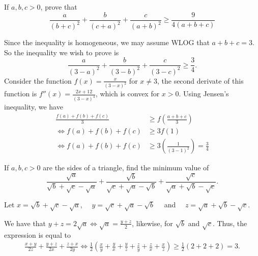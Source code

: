 \documentclass[12pt, paper=letter]{scrartcl}
\begin{document}
    \begin{problem*}
        If $a,b,c > 0$, prove that
        \[
            \frac{a}{(b + c)^2} + \frac{b}{(c + a)^2} + \frac{c}{(a + b)^2} \geq \frac{9}{4(a + b + c)}
        \]
    \end{problem*}
    \begin{solution*}
        Since the inequality is homogeneous, we may assume WLOG that $a + b + c = 3$.
        So the inequality we wish to prove is
        \[
            \frac{a}{(3 - a)^2} + \frac{b}{(3 - b)^2} + \frac{c}{(3 - c)^2} \geq \frac{3}{4}.
        \]
        Consider the function $f(x) = \frac{x}{(3 - x)^2}$ for $x \neq 3$, the second derivate of this function is $f''(x) = \frac{2x + 12}{(3 - x)^4}$, which is convex for $x > 0$.
        Using Jensen's inequality, we have
        \begin{align*}
            \frac{f(a) + f(b) + f(c)}{3} &\geq f \left(\frac{a + b + c }{3}\right)\\[3mm]
            \iff f(a) + f(b) + f(c) &\geq 3 f(1)\\[3mm]
            \iff f(a) + f(b) + f(c) &\geq 3 \left(\frac{1}{(3 - 1)^2}\right) = \frac{3}{4}
        \end{align*}
    \end{solution*}

    \begin{problem*}
        If $a,b,c > 0$ are the sides of a triangle, find the minimum value of
        \[
            \frac{\sqrt {a}}{\sqrt {b} + \sqrt {c} - \sqrt {a}} + \frac{\sqrt {b}}{\sqrt {c} + \sqrt {a} - \sqrt {b}} + \frac{\sqrt {c}}{\sqrt {a} + \sqrt {b} - \sqrt {c}}.
        \]
    \end{problem*}
    \begin{solution*}
        Let $x = \sqrt {b} + \sqrt {c} - \sqrt {a}$, $\quad y = \sqrt {c} + \sqrt {a} - \sqrt {b}\quad$ and $\quad z = \sqrt {a} + \sqrt {b} - \sqrt {c}$.

        We have that $y + z = 2 \sqrt {a} \iff \sqrt {a} = \frac{y + z}{2}$, likewise, for $\sqrt {b}$ and $\sqrt {c}$.
        Thus, the expression is equal to
        \begin{align*}
            \frac{x + y}{2z} + \frac{y + z}{2x} + \frac{z + x}{2y}
            \iff \frac{1}{2} \left(\frac{x}{y} + \frac{y}{x} + \frac{y}{z} + \frac{z}{y} + \frac{z}{x} + \frac{x}{z}\right)
            \geq \frac{1}{2} (2 + 2 + 2) = 3.
        \end{align*}
    \end{solution*}
\end{document}

